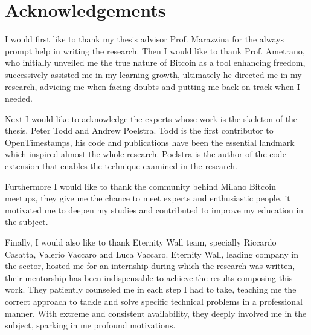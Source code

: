 \chapter{Acknowledgements}
\label{chpr:acknowledgement}

I would first like to thank my thesis advisor Prof. Marazzina for the always prompt help in writing the research.
Then I would like to thank Prof. Ametrano, who initially unveiled me the true nature of Bitcoin as a tool enhancing freedom, successively assisted me in my learning growth, ultimately he directed me in my research, advicing me when facing doubts and putting me back on track when I needed. 

Next I would like to acknowledge the experts whose work is the skeleton of the thesis, Peter Todd and Andrew Poelstra.
Todd is the first contributor to OpenTimestamps, his code and publications have been the essential landmark which inspired almost the whole research.
Poelstra is the author of the code extension that enables the technique examined in the research.

Furthermore I would like to thank the community behind Milano Bitcoin meetups, they give me the chance to meet experts and enthusiastic people, it motivated me to deepen my studies and contributed to improve my education in the subject.

Finally, I would also like to thank Eternity Wall team, specially Riccardo Casatta, Valerio Vaccaro and Luca Vaccaro.
Eternity Wall, leading company in the sector, hosted me for an internship during which the research was written, 
their mentorship has been indispensable to achieve the results composing this work.
They patiently counseled me in each step I had to take, teaching me the correct approach to tackle and solve specific technical problems in a professional manner. 
With extreme and consistent availability, they deeply involved me in the subject, sparking in me profound motivations.